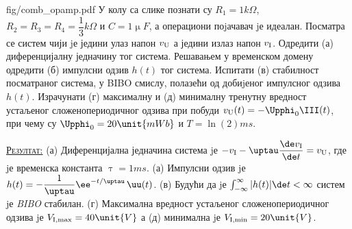 \mnDifficult
\begin{slikaDesno}{fig/comb_opamp.pdf}
\PID 
У колу са слике познати су $R_1 = 1\unit{k\Omega}$, 
$R_2 = R_3 = R_4 = \dfrac{1}{3}\unit{k\Omega}$ и 
$C = 1\unit{\upmu F}$, а
операциони поjачавач jе идеалан. 
Посматра се систем чији jе једини улаз напон
$v_{\rm U}$ а једини излаз напон $v_{\rm I}$. 
Одредити 
(а) диференцијалну једначину тог система. Решавањем у временском домену одредити 
(б) импулсни одзив $h(t)$
тог система. Испитати (в) стабилност посматраног система, у BIBO смислу,
полазећи од добиjеног импулсног одзива $h(t)$. 
Израчунати (г) максималну
и (д) минималну тренутну вредност устаљеног сложенопериодичног одзива
при побуди 
$v_{\rm U} (t) = -\Upphi_0 \III(t)$, 
при чему су $\Upphi_0 = 20\unit{mWb}$ и $T = \ln(2)\unit{ms}$.
\end{slikaDesno}
\vspace*{2mm}

\textsc{\underline{Резултат:}}
(а) Диференцијална једначина система jе 
$-v_{\rm I} - \uptau \dfrac{\de v_{\rm I}}{\de t} = v_{\rm U}$, где jе временска константа 
$\uptau = 1\unit{ms}$. 
(а) Импулсни одзив jе $h(t) = -\dfrac{1}{\uptau} \ee^{-t/\uptau}\,\uu(t)$. 
(в) Будући да jе 
$ \int_{-\infty}^{\infty} |h(t)| \de t < \infty$
систем jе \textit{BIBO} стабилан. 
(г) Максимална вредност устаљеног сложенопериодичног одзива jе 
$V_{\rm I,max} = 40\unit{V}$ а (д) 
минимална jе $V_{\rm I,min} = 20\unit{V}$.